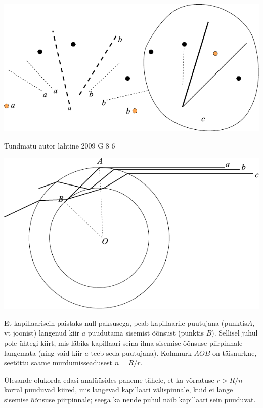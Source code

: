 \documentclass[11pt]{article}
\begin{document}
{{\begin{center}
	\includegraphics[width=0.97\linewidth]{2009-v2g-08-lah}
\end{center}
\fi
}

{Tundmatu autor} %
{lahtine} %
{2009} %
{G 8} %
{6} %
{

\ifSolution
\begin{center}
	\includegraphics[width=\linewidth]{2009-lahg-08-lah}
\end{center}

Et kapillaarisein paistaks null-paksusega, peab kapillaarile puutujana (punktis$A$, vt joonist) langenud kiir $a$ puudutama sisemist õõnsust (punktis $B$). Sellisel juhul pole ühtegi kiirt, mis läbiks kapillaari seina ilma sisemise õõnsuse piirpinnale langemata (ning vaid kiir $a$ teeb seda puutujana). Kolmnurk $AOB$ on täisnurkne, seetõttu saame murdumisseadusest $n= R/r$. 

Ülesande olukorda edasi analüüsides paneme tähele, et ka võrratuse $r> R/n$ korral puuduvad kiired, mis langevad kapillaari välispinnale, kuid ei lange sisemise õõnsuse piirpinnale; seega ka nende puhul näib kapillaari sein puuduvat. 

}}
\end{document}
